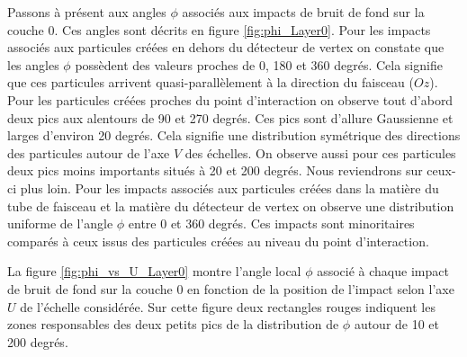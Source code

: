   
  \medskip
  
  Passons \`a pr\'esent aux angles $\phi$ associ\'es aux impacts de bruit de fond sur la couche 0. Ces angles sont d\'ecrits en figure \ref{fig:phi_Layer0}. Pour les impacts associ\'es aux particules cr\'e\'ees en dehors du d\'etecteur de vertex on constate que les angles $\phi$ poss\`edent des valeurs proches de 0, 180 et 360 degr\'es. Cela signifie que ces particules arrivent quasi-parall\`element \`a la direction du faisceau ($Oz$). Pour les particules cr\'e\'ees proches du point d'interaction on observe tout d'abord deux pics aux alentours de 90 et 270 degr\'es. Ces pics sont d'allure Gaussienne et larges d'environ 20 degr\'es. Cela signifie une distribution sym\'etrique des directions des particules autour de l'axe $V$ des \'echelles. On observe aussi pour ces particules deux pics moins importants situ\'es \`a 20 et 200 degr\'es. Nous reviendrons sur ceux-ci plus loin. Pour les impacts associ\'es aux particules cr\'e\'ees dans la mati\`ere du tube de faisceau et la mati\`ere du d\'etecteur de vertex on observe une distribution uniforme de l'angle $\phi$ entre 0 et 360 degr\'es. Ces impacts sont minoritaires compar\'es \`a ceux issus des particules cr\'e\'ees au niveau du point d'interaction.
  
  \medskip

  La figure \ref{fig:phi_vs_U_Layer0} montre l'angle local $\phi$ associ\'e \`a chaque impact de bruit de fond sur la couche 0 en fonction de la position de l'impact selon l'axe $U$ de l'\'echelle consid\'er\'ee. Sur cette figure deux rectangles rouges indiquent les zones responsables des deux petits pics de la distribution de $\phi$ autour de 10 et 200 degr\'es.
  
  \FloatBarrier

  \medskip
  
